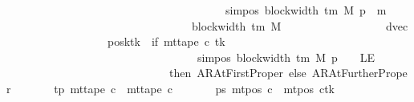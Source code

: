 \begin{isabellebody}
\ \ \ \ \ \ \ \ \ \ \ \ \ \ \ \ \ \ \ \ \ \ \ \ \ \ \ \ \ \ \ \ \ \ \ \ \ \ \ {\isacharparenleft}{\kern0pt}sim{\isacharunderscore}{\kern0pt}pos\ {\isacharparenleft}{\kern0pt}block{\isacharunderscore}{\kern0pt}width\ {\isacharparenleft}{\kern0pt}{\isasymGamma}{\isacharunderscore}{\kern0pt}tm\ M{\isacharparenright}{\kern0pt}{\isacharparenright}{\kern0pt}\ p\ {\isacharplus}{\kern0pt}\ m{\isacharparenright}{\kern0pt}{\isacharparenright}{\kern0pt}\isanewline
\ \ \ \ \ \ \ \ \ \ \ \ \ \ \ \ \ \ \ \ \ \ \ \ \ \ \ \ \ \ \ \ \ {\isacharbrackleft}{\kern0pt}{}{\isachardot}{\kern0pt}{\isachardot}{\kern0pt}{\isacharless}{\kern0pt}block{\isacharunderscore}{\kern0pt}width\ {\isacharparenleft}{\kern0pt}{\isasymGamma}{\isacharunderscore}{\kern0pt}tm\ M{\isacharparenright}{\kern0pt}{\isacharbrackright}{\kern0pt}{\isacharparenright}{\kern0pt}{\isacharparenright}{\kern0pt}{\isacharcomma}{\kern0pt}\isanewline
\ \ \ \ \ \ \ \ \ \ \ \ \ \ \ \ \ \ dvec{\isacharcomma}{\kern0pt}\isanewline
\ \ \ \ \ \ \ \ \ \ \ \ \ \ \ \ \ \ posk{\isacharparenleft}{\kern0pt}tk\ {\isacharcolon}{\kern0pt}{\isacharequal}{\kern0pt}\ if\ mt{\isacharunderscore}{\kern0pt}tape\ c{\isacharprime}{\kern0pt}\ tk\isanewline
\ \ \ \ \ \ \ \ \ \ \ \ \ \ \ \ \ \ \ \ \ \ \ \ \ \ \ \ \ \ \ \ \ \ {\isacharparenleft}{\kern0pt}sim{\isacharunderscore}{\kern0pt}pos\ {\isacharparenleft}{\kern0pt}block{\isacharunderscore}{\kern0pt}width\ {\isacharparenleft}{\kern0pt}{\isasymGamma}{\isacharunderscore}{\kern0pt}tm\ M{\isacharparenright}{\kern0pt}{\isacharparenright}{\kern0pt}\ p\ {\isacharminus}{\kern0pt}\ {}{\isacharparenright}{\kern0pt}\ {\isacharequal}{\kern0pt}\ LE{}\isanewline
\ \ \ \ \ \ \ \ \ \ \ \ \ \ \ \ \ \ \ \ \ \ \ \ \ \ \ \ \ then\ AR{\isacharunderscore}{\kern0pt}AtFirstProper\ else\ AR{\isacharunderscore}{\kern0pt}AtFurtherProper{\isacharparenright}{\kern0pt}{\isacharparenright}{\kern0pt}{\isachardoublequoteclose}\isanewline
\ \ \ \ \ \ \ tp{\isacharcolon}{\kern0pt}\ {\isachardoublequoteopen}mt{\isacharunderscore}{\kern0pt}tape\ c{\isacharprime}{\kern0pt}{\isacharprime}{\kern0pt}\ {\isacharequal}{\kern0pt}\ mt{\isacharunderscore}{\kern0pt}tape\ c{\isacharprime}{\kern0pt}{\isachardoublequoteclose}\isanewline
\ \ \ \ \ \ \ ps{\isacharcolon}{\kern0pt}\ {\isachardoublequoteopen}mt{\isacharunderscore}{\kern0pt}pos\ c{\isacharprime}{\kern0pt}{\isacharprime}{\kern0pt}\ {\isacharequal}{\kern0pt}\ {\isacharparenleft}{\kern0pt}mt{\isacharunderscore}{\kern0pt}pos\ c{\isacharprime}{\kern0pt}{\isacharparenright}{\kern0pt}{\isacharparenleft}{\kern0pt}tk\ {\isacharcolon}{\kern0pt}{\isacharequal}{\kern0pt}\isanewline

\end{isabellebody}
